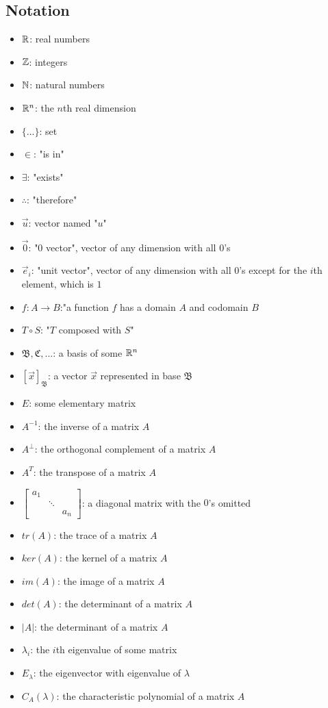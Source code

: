 \documentclass[12pt]{article}
\begin{document}
{{\subsection{Notation}
    \begin{itemize}
        \item $\mathbb{R}$: real numbers
        \item $\mathbb{Z}$: integers
        \item $\mathbb{N}$: natural numbers
        \item $\mathbb{R}^n$: the $n$th real dimension
        \item $\{...\}$: set
        \item $\in$: "is in"
        \item $\exists$: "exists"
        \item $\therefore$: "therefore"
        \item $\Vec{u}$: vector named "$u$"
        \item $\Vec{0}$: "0 vector", vector of any dimension with all $0$'s
        \item $\vec{e}_i$: "unit vector", vector of any dimension with all $0$'s except for the $i$th element, which is $1$
        \item $f: A \to B$:"a function $f$ has a domain $A$ and codomain $B$
        \item $T \circ S$: "$T$ composed with $S$"
        \item $\mathfrak{B}, \mathfrak{C}, ...$: a basis of some $\mathbb{R}^n$
        \item $[\vec{x}]_{\mathfrak{B}}$: a vector $\vec{x}$ represented in base $\mathfrak{B}$
        \item $E$: some elementary matrix
       \item $A^{-1}$: the inverse of a matrix $A$
       \item $A^\bot$: the orthogonal complement of a matrix $A$
       \item $A^T$: the transpose of a matrix $A$
       \item $\begin{bmatrix}
           a_1 & \\
            & \ddots&\\
            & & a_n
         \end{bmatrix}$: a diagonal matrix with the $0$'s omitted
       \item $tr(A)$: the trace of a matrix $A$
       \item $ker(A)$: the kernel of a matrix $A$
       \item $im(A)$: the image of a matrix $A$
       \item $det(A)$: the determinant of a matrix $A$
       \item $|A|$: the determinant of a matrix $A$
       \item $\lambda_i$: the $i$th eigenvalue of some matrix
       \item $E_\lambda$: the eigenvector with eigenvalue of $\lambda$
       \item $C_A(\lambda)$: the characteristic polynomial of a matrix $A$
    \end{itemize}
\newpage
}}
\end{document}
